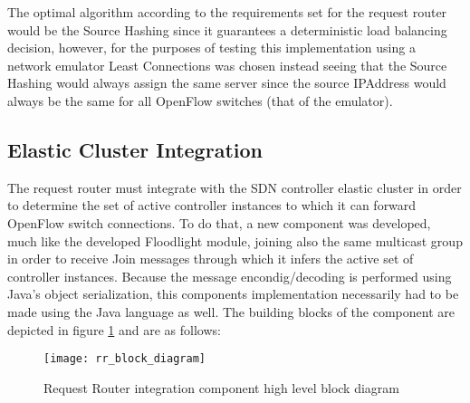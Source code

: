 %
The optimal algorithm according to the requirements set for the request router would be the Source Hashing since it guarantees a deterministic load balancing decision, however, for the purposes of testing this implementation using a network emulator Least Connections was chosen instead seeing that the Source Hashing would always assign the same server since the source \gls{IPAddress} would always be the same for all OpenFlow switches (that of the emulator).
%
\subsection{Elastic Cluster Integration}
\label{subsection:elastic-cluster-integration-implementation}
The request router must integrate with the \gls{SDN} controller elastic cluster in order to determine the set of active controller instances to which it can forward OpenFlow switch connections.
To do that, a new component was developed, much like the developed Floodlight module, joining also the same multicast group in order to receive Join messages through which it infers the active set of controller instances.
Because the message encondig/decoding is performed using Java's object serialization, this components implementation necessarily had to be made using the Java language as well.
The building blocks of the component are depicted in figure \ref{fig:rr_block_diagram} and are as follows:
%
\begin{figure}
	\centering
	\texttt{[image: rr\_block\_diagram]}
	\caption{Request Router integration component high level block diagram}
	\label{fig:rr_block_diagram}
\end{figure}
%
